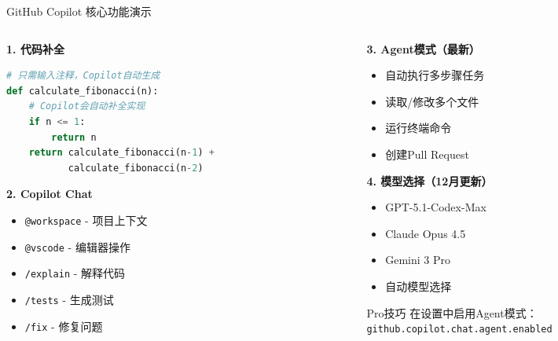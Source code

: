 \documentclass[aspectratio=169,11pt]{beamer}
\begin{document}
\begin{frame}[fragile]{GitHub Copilot 核心功能演示}
    \begin{columns}
        \begin{column}{0.5\textwidth}
            \textbf{1. 代码补全}
            \begin{lstlisting}[language=Python]
# 只需输入注释，Copilot自动生成
def calculate_fibonacci(n):
    # Copilot会自动补全实现
    if n <= 1:
        return n
    return calculate_fibonacci(n-1) + 
           calculate_fibonacci(n-2)
            \end{lstlisting}
            
            \vspace{0.3cm}
            \textbf{2. Copilot Chat}
            \begin{itemize}
                \item \texttt{@workspace} - 项目上下文
                \item \texttt{@vscode} - 编辑器操作
                \item \texttt{/explain} - 解释代码
                \item \texttt{/tests} - 生成测试
                \item \texttt{/fix} - 修复问题
            \end{itemize}
        \end{column}
        \begin{column}{0.5\textwidth}
            \textbf{3. Agent模式（最新）}
            \begin{itemize}
                \item 自动执行多步骤任务
                \item 读取/修改多个文件
                \item 运行终端命令
                \item 创建Pull Request
            \end{itemize}
            
            \vspace{0.3cm}
            \textbf{4. 模型选择（12月更新）}
            \begin{itemize}
                \item GPT-5.1-Codex-Max
                \item Claude Opus 4.5
                \item Gemini 3 Pro
                \item 自动模型选择
            \end{itemize}
            
            \vspace{0.3cm}
            \begin{alertblock}{Pro技巧}
                在设置中启用Agent模式：\\
                \texttt{github.copilot.chat.agent.enabled}
            \end{alertblock}
        \end{column}
    \end{columns}
\end{frame}
\end{document}
